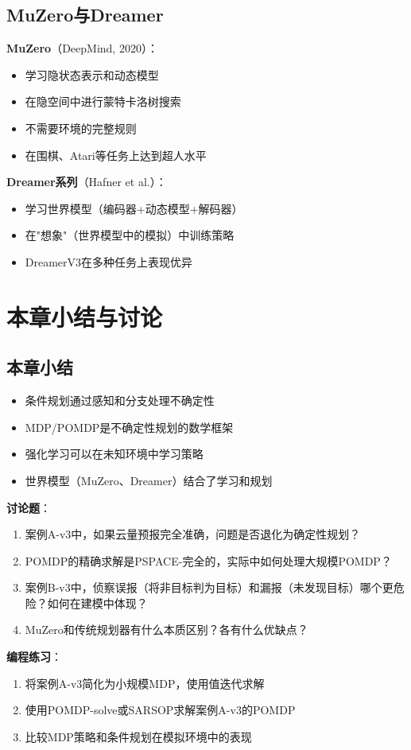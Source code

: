 \subsection{MuZero与Dreamer}

\textbf{MuZero}（DeepMind, 2020）：
\begin{itemize}[leftmargin=2em]
  \item 学习隐状态表示和动态模型
  \item 在隐空间中进行蒙特卡洛树搜索
  \item 不需要环境的完整规则
  \item 在围棋、Atari等任务上达到超人水平
\end{itemize}

\textbf{Dreamer系列}（Hafner et al.）：
\begin{itemize}[leftmargin=2em]
  \item 学习世界模型（编码器+动态模型+解码器）
  \item 在"想象"（世界模型中的模拟）中训练策略
  \item DreamerV3在多种任务上表现优异
\end{itemize}

\section{本章小结与讨论}

\subsection*{本章小结}

\begin{itemize}[leftmargin=2em]
  \item 条件规划通过感知和分支处理不确定性
  \item MDP/POMDP是不确定性规划的数学框架
  \item 强化学习可以在未知环境中学习策略
  \item 世界模型（MuZero、Dreamer）结合了学习和规划
\end{itemize}

\begin{discussbox}
\textbf{讨论题}：
\begin{enumerate}
  \item 案例A-v3中，如果云量预报完全准确，问题是否退化为确定性规划？
  \item POMDP的精确求解是PSPACE-完全的，实际中如何处理大规模POMDP？
  \item 案例B-v3中，侦察误报（将非目标判为目标）和漏报（未发现目标）哪个更危险？如何在建模中体现？
  \item MuZero和传统规划器有什么本质区别？各有什么优缺点？
\end{enumerate}

\textbf{编程练习}：
\begin{enumerate}
  \item 将案例A-v3简化为小规模MDP，使用值迭代求解
  \item 使用POMDP-solve或SARSOP求解案例A-v3的POMDP
  \item 比较MDP策略和条件规划在模拟环境中的表现
\end{enumerate}
\end{discussbox}
